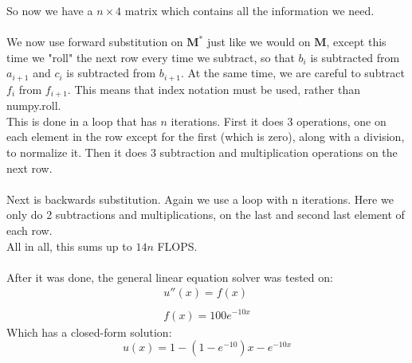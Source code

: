 \documentclass[a4paper,12pt,norsk]{article}
\begin{document}
	So now we have a $n \times 4$ matrix which contains all the information we need.\\
	\\
	We now use forward substitution on $\textbf{M}^*$ just like we would on $\textbf{M}$, except this time we "roll" the next row every time we subtract, so that $b_i$ is subtracted from $a_{i+1}$ and $c_i$ is subtracted from $b_{i+1}$. At the same time, we are careful to subtract $f_i$ from $f_{i+1}$. This means that index notation must be used, rather than numpy.roll.\\
	This is done in a loop that has $n$ iterations. First it does 3 operations, one on each element in the row except for the first (which is zero), along with a division, to normalize it. Then it does 3 subtraction and multiplication operations on the next row.\\
	\\
	Next is backwards substitution. Again we use a loop with n iterations. Here we only do 2 subtractions and multiplications, on the last and second last element of each row.\\
	All in all, this sums up to $14n$ FLOPS.\\
	\\
	After it was done, the general linear equation solver was tested on:
	\begin{gather*}
		u''(x) = f(x)\\
		\\
		f(x) = 100e^{-10x}
	\end{gather*}
	Which has a closed-form solution:
	$$u(x) = 1 - (1 - e^{-10})x - e^{-10x} $$
\end{document}
